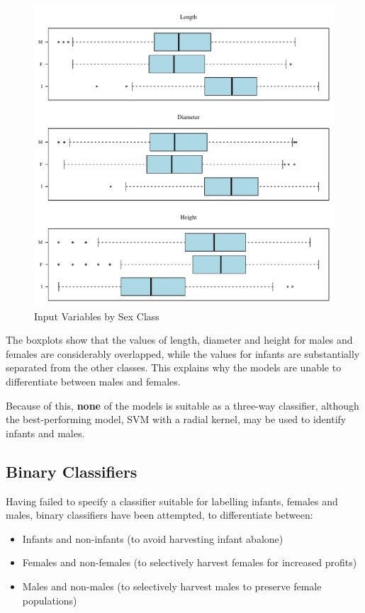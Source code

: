 \documentclass[11pt, a4paper]{article}
\begin{document}
    \begin{figure}[ht]
        \centering
        \includegraphics[width=\textwidth]{2.4.pdf}
        \caption{Input Variables by Sex Class}
        \label{boxplots}
    \end{figure}

    The boxplots show that the values of length, diameter and height for males and females are considerably overlapped, while the values for infants are substantially separated from the other classes. This explains why the models are unable to differentiate between males and females.

    Because of this, \textbf{none} of the models is suitable as a three-way classifier, although the best-performing model, SVM with a radial kernel, may be used to identify infants and males.

    \subsection{Binary Classifiers}

    Having failed to specify a classifier suitable for labelling infants, females and males, binary classifiers have been attempted, to differentiate between:

    \begin{itemize}
        \item Infants and non-infants (to avoid harvesting infant abalone)
        \item Females and non-females (to selectively harvest females for increased profits)
        \item Males and non-males (to selectively harvest males to preserve female populations)
    \end{itemize}
\end{document}

